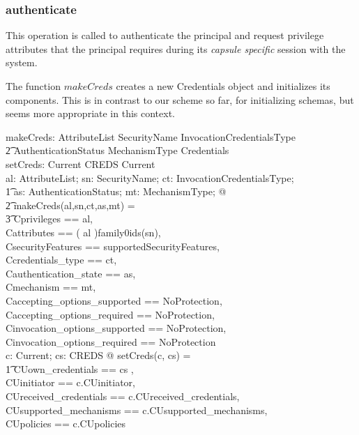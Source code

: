 \subsubsection{authenticate}
This operation is called to authenticate the principal and request privilege
attributes that the principal requires during its \emph{capsule specific}
session with the system.

The function $makeCreds$ creates a new Credentials object and initializes its
components.  This is in contrast to our scheme so far, for initializing schemas,
but seems more appropriate in this context.
\begin{axdef}
  makeCreds: AttributeList \cross SecurityName \cross InvocationCredentialsType \\
  \t2 \cross AuthenticationStatus \cross MechanismType \fun Credentials \\

  setCreds: Current \cross CREDS \fun Current \\
  \where
  \forall al: AttributeList; sn: SecurityName; ct: InvocationCredentialsType; \\
  \t1 as: AuthenticationStatus; mt: MechanismType; @ \\
  \t2 makeCreds(al,sn,ct,as,mt) = \\
  \t3 \lbind \< Cprivileges == \ran al, \\
  Cattributes == ( \ran al )\cup family0ids(sn), \\
  CsecurityFeatures == supportedSecurityFeatures, \\
  Ccredentials\_type == ct, \\
  Cauthentication\_state == as, \\
  Cmechanism == mt, \\
  Caccepting\_options\_supported == NoProtection, \\
  Caccepting\_options\_required == NoProtection, \\
  Cinvocation\_options\_supported == NoProtection, \\
  Cinvocation\_options\_required == NoProtection \rbind \> \\

  \forall c: Current; cs: CREDS @ setCreds(c, cs) = \\
  \t1 \lbind \< CUown\_credentials == \langle cs \rangle, \\
  CUinitiator == c.CUinitiator, \\
  CUreceived\_credentials == c.CUreceived\_credentials, \\
  CUsupported\_mechanisms == c.CUsupported\_mechanisms, \\
  CUpolicies == c.CUpolicies \rbind \> 
\end{axdef}


